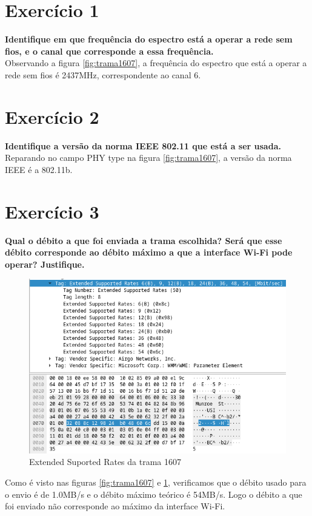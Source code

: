 \documentclass[a4paper]{report}
\begin{document}
\section{Exercício 1}
\textbf{Identifique em que frequência do espectro está a operar a rede sem fios,
e o canal que corresponde a essa frequência.}\\
Observando a figura \ref{fig:trama1607}, a frequência do espectro que está a
operar a rede sem fios é 2437MHz, correspondente ao canal 6.

\section{Exercício 2}
\textbf{Identifique a versão da norma IEEE 802.11 que está a ser usada.}\\
Reparando no campo PHY type na figura \ref{fig:trama1607}, a versão da norma
IEEE é a 802.11b.

\section{Exercício 3}
\textbf{Qual o débito a que foi enviada a trama escolhida? Será que esse débito
corresponde ao débito máximo a que a interface Wi-Fi pode operar?
Justifique.}

\begin{figure}[H]
    \centering 
    \includegraphics[width=\textwidth]{images/maxDataRateEx3.png}  
    \caption{Extended Suported Rates da trama 1607}
    \label{fig:maxDataRateEx3}
\end{figure}
Como é visto nas figuras \ref{fig:trama1607} e \ref{fig:maxDataRateEx3}, verificamos
que o débito usado para o envio é de 1.0MB/s e o débito máximo teórico é 54MB/s.
Logo o débito a que foi enviado não corresponde ao máximo da interface Wi-Fi.
\end{document}
